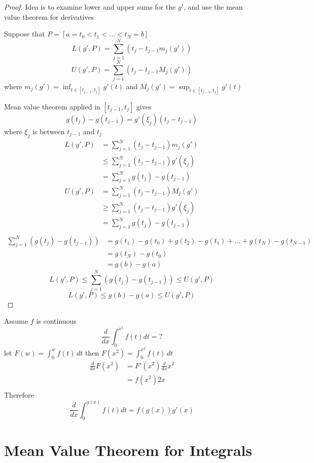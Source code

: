 \begin{proof}
  Idea is to examine lower and upper sums for the $g'$, and use the mean value theorem for derivatives
  
  Suppose that $P = [a = t_0 < t_1 < \dotsc < t_N = b]$ 
  \[L(g', P) = \sum_{j=1}^N (t_j - t_{j-1}m_j(g'))\]
  \[U(g', P) = \sum_{j=1}^N (t_j - t_{j-1}M_j(g'))\]
  where $\displaystyle m_j(g') = \inf_{t \in [t_{j-1}, t_j]} g'(t)$ and $\displaystyle M_j(g') = \sup_{t \in [t_{j-1}, t_j]} g'(t)$

  Mean value theorem applied in $[t_{j-1}, t_j]$ gives $$g(t_j) - g(t_{j-1}) = g'(\xi_j)(t_j - t_{j-1})$$ where $\xi_j$ is between $t_{j-1}$ and $t_j$
  \begin{align*}
    L(g', P) &= \sum_{j=1}^N (t_j - t_{j-1})m_j(g')\\
    &\leq \sum_{j=1}^N (t_j - t_{j-1})g'(\xi_j)\\
    &= \sum_{j=1}^N g(t_j) - g(t_{j-1})\\
    U(g', P) &= \sum_{j=1}^N (t_j - t_{j-1})M_j(g')\\
    &\geq \sum_{j=1}^N (t_j - t_{j-1})g'(\xi_j)\\
    &= \sum_{j=1}^N g(t_j) - g(t_{j-1})\\
  \end{align*}
  \begin{align*}
    \sum_{j=1}^{N}(g(t_j) - g(t_{j-1})) &= g(t_1) - g(t_0) + g(t_2) - g(t_1) + \dotsc + g(t_N) - g(t_{N-1})\\
    &= g(t_N) - g(t_0)\\
    &= g(b) - g(a)
  \end{align*}
  \[L(g', P) \le \sum_{j=1}^{N}(g(t_j) - g(t_{j-1})) \le U(g', P)\]
  \[L(g', P) \le g(b) - g(a) \le U(g', P)\]
\end{proof}

\begin{example*}
  Assume $f$ is continuous
  \[\frac{d}{dx}\int_0^{x^2} f(t) dt = ?\]
  let $\displaystyle F(w) = \int_0^w f(t)\,dt$ then $\displaystyle F(x^2) = \int_0^{x^2} f(t)\,dt$
  \begin{align*}
    \frac{d}{dx}F(x^2) &= F'(x^2) \frac{d}{dx}x^2\\
    &= f(x^2)2x\\
  \end{align*}
  Therefore
  \[\frac{d}{dx}\int_0^{g(x)} f(t) dt = f(g(x))g'(x)\]
\end{example*}

\section{Mean Value Theorem for Integrals}

